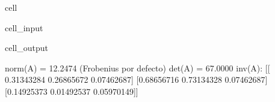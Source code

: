 \documentclass[letterpaper,10pt,english]{jupyterBook}
\begin{document}
\begin{sphinxuseclass}{cell}\begin{sphinxVerbatimInput}

\begin{sphinxuseclass}{cell_input}
\begin{sphinxVerbatim}[commandchars=\\\{\}]
     

 
  
\end{sphinxVerbatim}

\end{sphinxuseclass}\end{sphinxVerbatimInput}
\begin{sphinxVerbatimOutput}

\begin{sphinxuseclass}{cell_output}
\begin{sphinxVerbatim}[commandchars=\\\{\}]
norm(A) = 12.2474 (Frobenius por defecto)
det(A) = \PYGZhy{}67.0000
inv(A):
 [[ 0.31343284  0.26865672  0.07462687]
 [\PYGZhy{}0.68656716 \PYGZhy{}0.73134328  0.07462687]
 [\PYGZhy{}0.14925373  0.01492537  0.05970149]]
\end{sphinxVerbatim}

\end{sphinxuseclass}\end{sphinxVerbatimOutput}

\end{sphinxuseclass}
\end{document}
